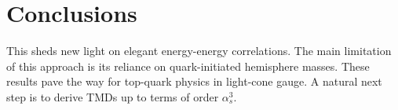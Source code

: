 \section{Conclusions}\label{sec:conclusions}

This sheds new light on elegant energy-energy correlations. The main
limitation of this approach is its reliance on quark-initiated
hemisphere masses. These results pave the way for top-quark physics in
light-cone gauge. A natural next step is to derive TMDs up to terms of
order $\alpha_s^3$.

